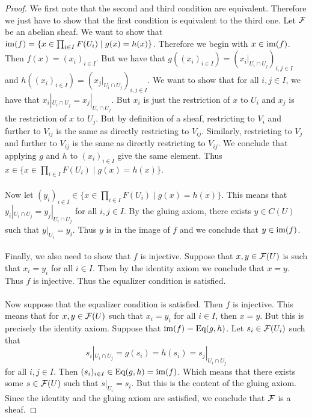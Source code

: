 \documentclass[a4paper]{article}
\begin{document}
\begin{thm}{}{}
\begin{proof}
We first note that the second and third condition are equivalent. Therefore we just have to show that the first condition is equivalent to the third one. Let $\mathcal{F}$ be an abelian sheaf. We want to show that $\operatorname{im}(f)=\{x\in\prod_{i\in I}F(U_i)\;|\;g(x)=h(x)\}$. Therefore we begin with $x\in\operatorname{im}(f)$. Then $f(x)=(x_i)_{i\in I}$. But we have that $g((x_i)_{i\in I})=(x_i|_{U_i\cap U_j})_{i,j\in I}$ and $h((x_i)_{i\in I})=(x_j|_{U_i\cap U_j})_{i,j\in I}$. We want to show that for all $i,j\in I$, we have that $x_i|_{U_i\cap U_j}=x_j|_{U_i\cap U_j}$. But $x_i$ is just the restriction of $x$ to $U_i$ and $x_j$ is the restriction of $x$ to $U_j$. But by definition of a sheaf, restricting to $V_i$ and further to $V_{ij}$ is the same as directly restricting to $V_{ij}$. Similarly, restricting to $V_j$ and further to $V_{ij}$ is the same as directly restricting to $V_{ij}$. We conclude that applying $g$ and $h$ to $(x_i)_{i\in I}$ give the same element. Thus $x\in\{x\in\prod_{i\in I}F(U_i)\;|\;g(x)=h(x)\}$. \\~\\

Now let $(y_i)_{i\in I}\in\{x\in\prod_{i\in I}F(U_i)\;|\;g(x)=h(x)\}$. This means that $y_i|_{U_i\cap U_j}=y_j|_{U_i\cap U_j}$ for all $i,j\in I$. By the gluing axiom, there exists $y\in C(U)$ such that $y|_{U_i}=y_i$. Thus $y$ is in the image of $f$ and we conclude that $y\in\operatorname{im}(f)$. \\~\\

Finally, we also need to show that $f$ is injective. Suppose that $x,y\in\mathcal{F}(U)$ is such that $x_i=y_i$ for all $i\in I$. Then by the identity axiom we conclude that $x=y$. Thus $f$ is injective. Thus the equalizer condition is satisfied. \\~\\

Now suppose that the equalizer condition is satisfied. Then $f$ is injective. This means that for $x,y\in\mathcal{F}(U)$ such that $x_i=y_i$ for all $i\in I$, then $x=y$. But this is precisely the identity axiom. Suppose that $\operatorname{im}(f)=\text{Eq}(g,h)$. Let $s_i\in\mathcal{F}(U_i)$ such that $$s_i|_{U_i\cap U_j}=g(s_i)=h(s_i)=s_j|_{U_i\cap U_j}$$ for all $i,j\in I$. Then $(s_i)_{i\in I}\in\text{Eq}(g,h)=\operatorname{im}(f)$. Which means that there exists some $s\in\mathcal{F}(U)$ such that $s|_{U_i}=s_i$. But this is the content of the gluing axiom. Since the identity and the gluing axiom are satisfied, we conclude that $\mathcal{F}$ is a sheaf. 
\end{proof}
\end{thm}
\end{document}
